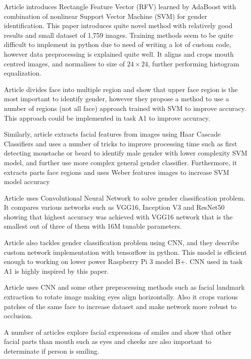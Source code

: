 \documentclass{article}
\begin{document}
Article \cite{4959635} introduces Rectangle Feature Vector (RFV) learned by AdaBoost with combination of nonlinear Support Vector Machine (SVM) for gender identification. This paper introduces quite novel method with relatively good results and small dataset of 1,759 images. Training methods seem to be quite difficult to implement in python due to need of writing a lot of custom code, however data preprocessing is explained quite well. It aligns and crops mouth centred images, and normalises to size of $24 \times 24$, further performing histogram equalization. 

Article \cite{5170659} divides face into multiple region and show that upper face region  is the most important to identify gender, however they propose a method to use a number of regions (not all face) approach trained with SVM to improve accuracy. This approach could be implemented in task A1 to improve accuracy.

Similarly, article \cite{6391660} extracts facial features from images using Haar Cascade Classifiers and uses a number of tricks to improve processing time such as first detecting moustache or beard to identify male gender with lower complexity SVM model, and further use more complex general gender classifier. Furthermore, it extracts parts face regions and uses Weber features images to increase SVM model accuracy 

Article \cite{9148181} uses Convolutional Neural Network to solve gender classification problem. It compares various networks such as VGG16, Inception V3 and ResNet50 showing that highest accuracy was achieved with VGG16 network that is the smallest out of three of them with 16M tunable parameters. 

Article \cite{8398872} also tackles gender classification problem using CNN, and they describe custom network implementation with tensorflow in python. This model is efficient enough to working on lower power Raspberry Pi 3 model B+. CNN used in task A1 is highly inspired by this paper.

Article \cite{8620951} uses CNN and some other preprocessing methods such as facial landmark extraction to rotate image making eyes align horizontally. Also it crops various patches of the same face to increase dataset and make network more robust to occlusion.

A number of articles \cite{8578838,670950} explore facial expressions of smiles and show that other facial parts than mouth such as eyes and cheeks are also important to determinate if person is smiling. 
\end{document}
